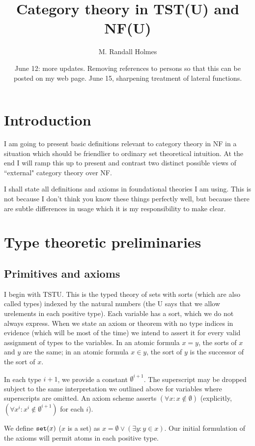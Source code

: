 \documentclass[12pt]{article}
\title{Category theory in TST(U) and NF(U)}
\author{M. Randall Holmes}
\date{June 12:  more updates.  Removing references to persons so that this can be posted on my web page.  June 15, sharpening treatment of lateral functions.}
\begin{document}
\maketitle

\section{Introduction}

I am going to present basic definitions relevant to category theory in NF  in a situation which should be friendlier to ordinary set theoretical intuition.
At the end I will ramp this up to present and contrast two distinct possible views of ``external" category theory over NF.


I shall state all definitions and axioms in foundational theories I am using.  This is not because I don't think you know these things perfectly well, but because there are subtle differences in usage which it is my responsibility to make clear.

\section{Type theoretic preliminaries}

\subsection{Primitives and axioms}

I begin with TSTU.  This is the typed theory of sets with sorts (which are also called types) indexed by the natural numbers (the U says that we allow urelements in each positive type).  Each variable has a sort, which we do not always express.  When we
state an axiom or theorem with no type indices in evidence (which will be most of the time) we intend to assert it for every valid assignment of types to the variables.
In an atomic formula $x = y$, the sorts of $x$ and $y$ are the same;  in an atomic formula $x \in y$, the sort of $y$ is the successor of the sort of $x$.

In each type $i+1$, we provide a constant $\emptyset^{i+1}$.  The superscript may be dropped subject to the same interpretation we outlined above for variables where superscripts are omitted.  An axiom scheme asserts $(\forall x:x \not\in \emptyset)$ (explicitly,  $(\forall x^i:x^i \not\in \emptyset^{i+1})$ for each $i$).  

We define ${\tt set}(x)$ ($x$ is a set) as $x = \emptyset \vee (\exists y:y \in x)$.  Our initial formulation of the axioms will permit atoms in each positive type.
\end{document}
